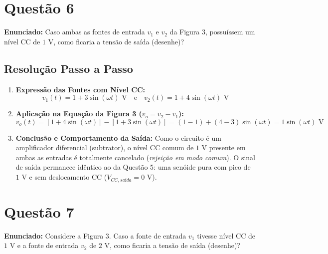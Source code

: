 \newpage

\section*{Questão 6}
\textbf{Enunciado:} Caso ambas as fontes de entrada $v_1$ e $v_2$ da Figura 3, possuíssem um nível CC de $1\text{ V}$, como ficaria a tensão de saída (desenhe)?

\subsection*{Resolução Passo a Passo}
\begin{enumerate}
    \item \textbf{Expressão das Fontes com Nível CC:}
    \begin{equation*}
        v_1(t) = 1 + 3\sin(\omega t)\text{ V} \quad \text{e} \quad v_2(t) = 1 + 4\sin(\omega t)\text{ V}
    \end{equation*}

    \item \textbf{Aplicação na Equação da Figura 3 ($v_o = v_2 - v_1$):}
    \begin{equation*}
        v_o(t) = [1 + 4\sin(\omega t)] - [1 + 3\sin(\omega t)] = (1 - 1) + (4 - 3)\sin(\omega t) = 1\sin(\omega t)\text{ V}
    \end{equation*}

    \item \textbf{Conclusão e Comportamento da Saída:}
    Como o circuito é um amplificador diferencial (subtrator), o nível CC comum de $1\text{ V}$ presente em ambas as entradas é totalmente cancelado (\textit{rejeição em modo comum}). O sinal de saída permanece idêntico ao da Questão 5: uma senóide pura com pico de $1\text{ V}$ e sem deslocamento CC ($V_{CC,sa\text{í}da} = 0\text{ V}$).
\end{enumerate}



\section*{Questão 7}
\textbf{Enunciado:} Considere a Figura 3. Caso a fonte de entrada $v_1$ tivesse nível CC de $1\text{ V}$ e a fonte de entrada $v_2$ de $2\text{ V}$, como ficaria a tensão de saída (desenhe)?

